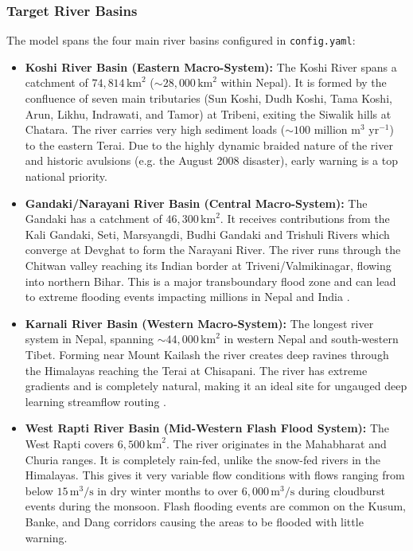 \documentclass[journal]{IEEEtran}
\begin{document}
\subsubsection{Target River Basins}
The model spans the four main river basins configured in \texttt{config.yaml}:
\begin{itemize}
\item \textbf{Koshi River Basin (Eastern Macro-System):} The Koshi River spans a catchment of $74{,}814\,\text{km}^2$ ($\sim 28{,}000\,\text{km}^2$ within Nepal). It is formed by the confluence of seven main tributaries (Sun Koshi, Dudh Koshi, Tama Koshi, Arun, Likhu, Indrawati, and Tamor) at Tribeni, exiting the Siwalik hills at Chatara. The river carries very high sediment loads ($\sim 100$ million m$^3$ yr$^{-1}$) to the eastern Terai. Due to the highly dynamic braided nature of the river and historic avulsions (e.g. the August 2008 disaster), early warning is a top national priority.
\item \textbf{Gandaki/Narayani River Basin (Central Macro-System):} The Gandaki has a catchment of $46{,}300\,\text{km}^2$. It receives contributions from the Kali Gandaki, Seti, Marsyangdi, Budhi Gandaki and Trishuli Rivers which converge at Devghat to form the Narayani River. The river runs through the Chitwan valley reaching its Indian border at Triveni/Valmikinagar, flowing into northern Bihar. This is a major transboundary flood zone and can lead to extreme flooding events impacting millions in Nepal and India \cite{bhattarai2024leveraging}.
\item \textbf{Karnali River Basin (Western Macro-System):} The longest river system in Nepal, spanning $\sim 44{,}000\,\text{km}^2$ in western Nepal and south-western Tibet. Forming near Mount Kailash the river creates deep ravines through the Himalayas reaching the Terai at Chisapani. The river has extreme gradients and is completely natural, making it an ideal site for ungauged deep learning streamflow routing \cite{nearing2024global}.
\item \textbf{West Rapti River Basin (Mid-Western Flash Flood System):} The West Rapti covers $6{,}500\,\text{km}^2$. The river originates in the Mahabharat and Churia ranges. It is completely rain-fed, unlike the snow-fed rivers in the Himalayas. This gives it very variable flow conditions with flows ranging from below $15\,\text{m}^3/\text{s}$ in dry winter months to over $6{,}000\,\text{m}^3/\text{s}$ during cloudburst events during the monsoon. Flash flooding events are common on the Kusum, Banke, and Dang corridors causing the areas to be flooded with little warning.
\end{itemize}
\end{document}
